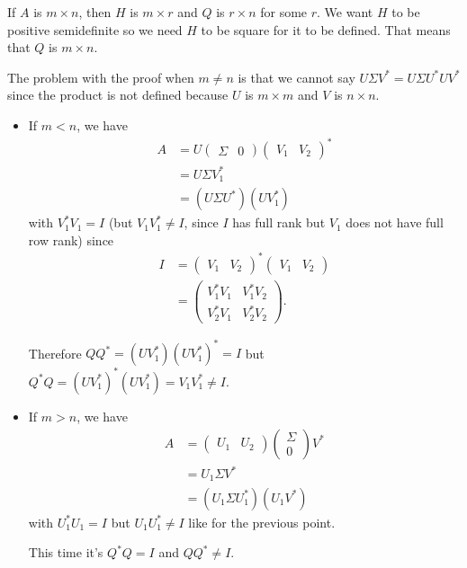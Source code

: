 \begin{solution}
	If $A$ is $m \times n$, then $H$ is $m \times r$ and $Q$ is $r \times n$ for some $r$.
	We want $H$ to be positive semidefinite so we need $H$ to be square for it to be defined.
	That means that $Q$ is $m \times n$.
	
	The problem with the proof when $m \neq n$ is that we cannot say
	$U \Sigma V^* = U \Sigma U^* U V^*$ since the product is not defined because $U$ is $m \times m$
	and $V$ is $n \times n$.
	\begin{itemize}
		\item If $m < n$, we have
		\begin{align*}
		A
		& = U
		\begin{pmatrix}
		\Sigma & 0
		\end{pmatrix}
		\begin{pmatrix}
		V_1 & V_2
		\end{pmatrix}^*\\
		& = U \Sigma V_1^*\\
		& = (U \Sigma U^*) (U V_1^*)
		\end{align*}
		with $V_1^*V_1 = I$ (but $V_1V_1^* \neq I$, since $I$ has full rank but $V_1$ does not have full row rank)
		since
		\begin{align*}
		I
		& =
		\begin{pmatrix}
		V_1 & V_2
		\end{pmatrix}^*
		\begin{pmatrix}
		V_1 & V_2
		\end{pmatrix}\\
		& =
		\begin{pmatrix}
		V_1^*V_1 & V_1^*V_2\\
		V_2^*V_1 & V_2^*V_2
		\end{pmatrix}.
		\end{align*}
		
		Therefore $QQ^* = (U V_1^*) (U V_1^*)^* = I$ but $Q^*Q = (U V_1^*)^* (U V_1^*) = V_1V_1^* \neq I$.
		\item If $m > n$, we have
		\begin{align*}
		A
		& =
		\begin{pmatrix}
		U_1 & U_2
		\end{pmatrix}
		\begin{pmatrix}
		\Sigma \\ 0
		\end{pmatrix}
		V^*\\
		& = U_1 \Sigma V^*\\
		& = (U_1 \Sigma U_1^*) (U_1 V^*)
		\end{align*}
		with $U_1^*U_1 = I$ but $U_1U_1^* \neq I$ like for the previous point.
		
		This time it's $Q^*Q = I$ and $QQ^* \neq I$.
	\end{itemize}
\end{solution}

